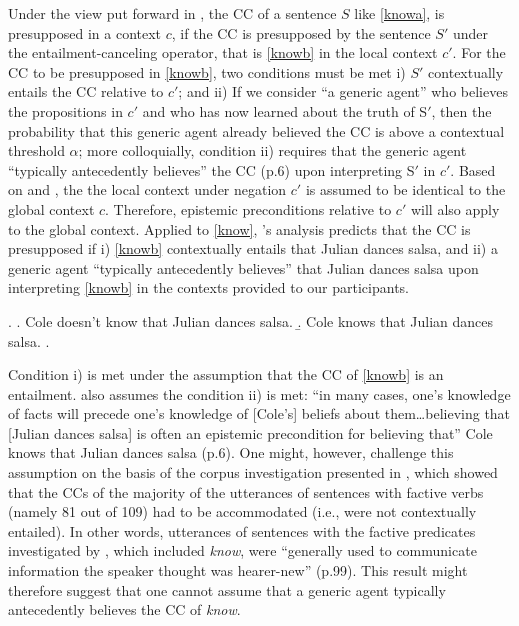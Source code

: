 \documentclass[a4paper,12pt,twoside]{article}
\newcommand{\poscite}[1]{\citeauthor{#1}'s \citeyear{#1}}
\begin{document}
    Under the view put forward in \citealt{schlenker_triggering_2021}, the CC of a sentence $S$ like \ref{knowa}, is presupposed in a context $c$, if the CC 
    is presupposed by the sentence $S'$ under the entailment-canceling operator, that is \ref{knowb} in the local context $c'$.
    For the CC to be presupposed in \ref{knowb}, two conditions must be met %
	i) $S'$ contextually entails the CC relative to $c'$;
	and ii) If we consider ``a generic agent'' who believes the propositions in $c'$ and who has now learned about the truth of S$'$, then the probability that this generic agent already believed the CC is above a contextual threshold $\alpha$;
	more colloquially, condition ii) requires that the generic agent ``typically antecedently believes'' the CC (p.6) upon interpreting S$'$ in $c'$. Based on \citealt{heim_projection_1983} and \citealt{schlenker_local_2009}, the the local context under negation $c'$ is assumed to be identical to the global context $c$. Therefore, epistemic preconditions relative to $c'$ will also apply to the global context. Applied to \ref{know}, \poscite{schlenker_triggering_2021} analysis predicts that the CC  is presupposed if i) \ref{knowb} contextually entails that Julian dances salsa, and ii) a generic agent ``typically antecedently believes'' that Julian dances salsa upon interpreting \ref{knowb} in the contexts provided to our participants.

	\ex.\label{know} 
	\a.\label{knowa} Cole doesn't know that Julian dances salsa.
	\b.\label{knowb} Cole knows that Julian dances salsa.
	\z.

	Condition i) is met under the assumption that the CC of \ref{knowb} is an entailment. \citealt{schlenker_triggering_2021} also assumes the condition ii) is met: ``in many cases, one's knowledge of facts will precede one's knowledge of [Cole's] beliefs about them\ldots believing that [Julian dances salsa] is often an epistemic precondition for believing that'' Cole knows that Julian dances salsa (p.6). One might, however, challenge this assumption on the basis of the corpus investigation presented in \citealt{spenader_presuppositions_2002}, which showed that the CCs of the majority of the utterances of sentences with factive verbs (namely 81 out of 109) had to be accommodated (i.e., were not contextually entailed). In other words, utterances of sentences with the factive predicates investigated by \citet{spenader_presuppositions_2002}, which included \emph{know}, were ``generally used to communicate information the speaker thought was hearer-new'' (p.99). This result might therefore suggest that one cannot assume that a generic agent typically antecedently believes the CC of {\em know}.
\end{document}
